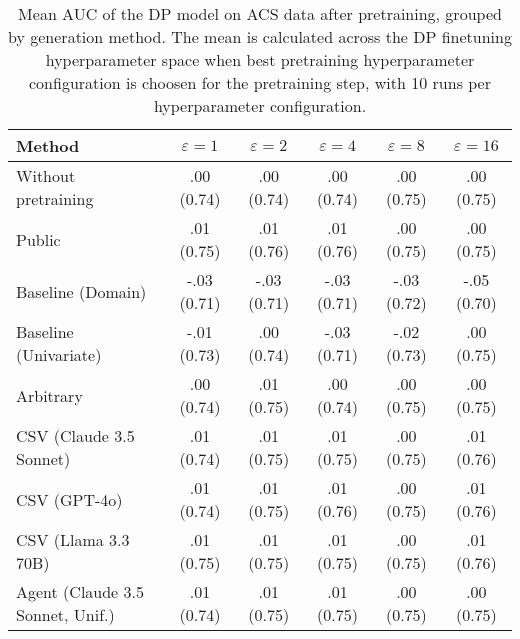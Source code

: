 \begin{table}[h!]
    \centering
    \caption{Mean AUC of the DP model on ACS data after pretraining, grouped by generation method. The mean is calculated across the DP finetuning hyperparameter space when best pretraining hyperparameter configuration is choosen for the pretraining step, with 10 runs per hyperparameter configuration.}
    \label{tab:epsilon_comparison}
    \begin{tabular}{lccccc}
    \toprule
    Method & $\varepsilon=1$ & $\varepsilon=2$ & $\varepsilon=4$ & $\varepsilon=8$ & $\varepsilon=16$ \\
    \midrule
    Without pretraining & .00 {\small (0.74)} & .00 {\small (0.74)} & .00 {\small (0.74)} & .00 {\small (0.75)} & .00 {\small (0.75)} \\
    \arrayrulecolor{black!50!}\midrule
    Public & \cellcolor{gold!30}.01 {\small (0.75)} & \cellcolor{gold!30}.01 {\small (0.76)} & \cellcolor{gold!30}.01 {\small (0.76)} & \cellcolor{bronze!30}.00 {\small (0.75)} & .00 {\small (0.75)} \\
    \arrayrulecolor{black!50!}\midrule
    Baseline (Domain) & -.03 {\small (0.71)} & -.03 {\small (0.71)} & -.03 {\small (0.71)} & -.03 {\small (0.72)} & -.05 {\small (0.70)} \\
    Baseline (Univariate) & -.01 {\small (0.73)} & .00 {\small (0.74)} & -.03 {\small (0.71)} & -.02 {\small (0.73)} & .00 {\small (0.75)} \\
    \arrayrulecolor{black!50!}\midrule
    Arbitrary & .00 {\small (0.74)} & .01 {\small (0.75)} & .00 {\small (0.74)} & .00 {\small (0.75)} & .00 {\small (0.75)} \\
    \arrayrulecolor{black!50!}\midrule
    CSV (Claude 3.5 Sonnet) & .01 {\small (0.74)} & .01 {\small (0.75)} & \cellcolor{silver!30}.01 {\small (0.75)} & \cellcolor{silver!30}.00 {\small (0.75)} & \cellcolor{silver!30}.01 {\small (0.76)} \\
    CSV (GPT-4o) & .01 {\small (0.74)} & \cellcolor{silver!30}.01 {\small (0.75)} & \cellcolor{gold!30}.01 {\small (0.76)} & \cellcolor{bronze!30}.00 {\small (0.75)} & \cellcolor{gold!30}.01 {\small (0.76)} \\
    CSV (Llama 3.3 70B) & \cellcolor{silver!30}.01 {\small (0.75)} & \cellcolor{bronze!30}.01 {\small (0.75)} & \cellcolor{silver!30}.01 {\small (0.75)} & \cellcolor{silver!30}.00 {\small (0.75)} & .01 {\small (0.76)} \\
    \arrayrulecolor{black!50!}\midrule
    Agent (Claude 3.5 Sonnet, Unif.) & \cellcolor{bronze!30}.01 {\small (0.74)} & .01 {\small (0.75)} & \cellcolor{bronze!30}.01 {\small (0.75)} & .00 {\small (0.75)} & .00 {\small (0.75)} \\

\end{tabular}
\end{table}
